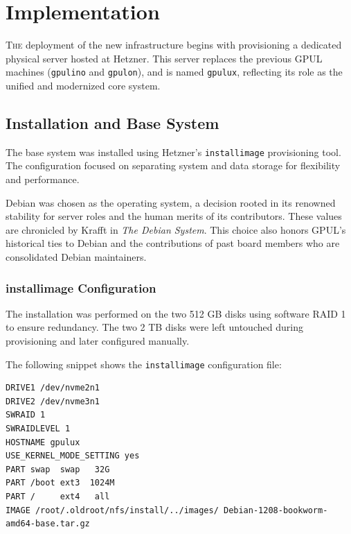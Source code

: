 %

\chapter{Implementation}
\label{chap:implementation}

\lettrine{T}{he} deployment of the new infrastructure begins with provisioning a dedicated physical server hosted at Hetzner\cite{hetzner-server-bidding}. This server replaces the previous GPUL machines (\texttt{gpulino} and \texttt{gpulon}), and is named \texttt{gpulux}, reflecting its role as the unified and modernized core system.

\section{Installation and Base System}

The base system was installed using Hetzner's \texttt{installimage}\cite{hetzner-installimage} provisioning tool. The configuration focused on separating system and data storage for flexibility and performance.

Debian was chosen as the operating system, a decision rooted in its renowned stability for server roles and the human merits of its contributors. These values are chronicled by Krafft in \emph{The Debian System}\cite{krafft2005debian}. This choice also honors GPUL's historical ties to Debian and the contributions of past board members who are consolidated Debian maintainers\cite{berto-debian-page}.

\subsection*{installimage Configuration}

The installation was performed on the two 512 GB disks using software RAID 1 to ensure redundancy. The two 2 TB disks were left untouched during provisioning and later configured manually.

The following snippet shows the \texttt{installimage} configuration file:

\begin{lstlisting}[caption={Configuration used by Hetzner's installimage script to deploy Debian on gpulux}]
DRIVE1 /dev/nvme2n1
DRIVE2 /dev/nvme3n1
SWRAID 1
SWRAIDLEVEL 1
HOSTNAME gpulux
USE_KERNEL_MODE_SETTING yes
PART swap  swap   32G
PART /boot ext3  1024M
PART /     ext4   all
IMAGE /root/.oldroot/nfs/install/../images/ Debian-1208-bookworm-amd64-base.tar.gz
\end{lstlisting}

